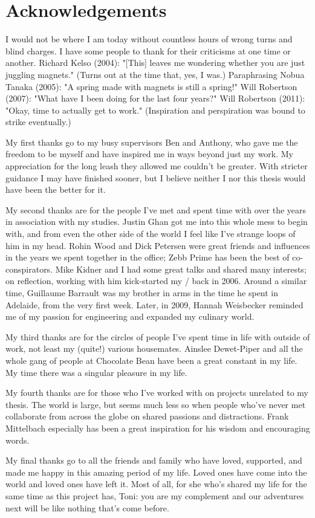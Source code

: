
\section{Acknowledgements}

I would not be where I am today without countless hours of wrong turns and
blind charges.
I have some people to thank for their criticisms at one time or another.
Richard Kelso (2004): "[This] leaves me wondering whether you are just juggling magnets." (Turns out at the time that, yes, I was.)
Paraphrasing Nobua Tanaka (2005): "A spring made with magnets is still a spring!"
Will Robertson (2007): "What have I been doing for the last four years?"
Will Robertson (2011): "Okay, time to actually get to work."
(Inspiration and perspiration was bound to strike eventually.)

My first thanks go to my busy supervisors Ben and Anthony, who gave me the freedom to be myself and have inspired me in ways beyond just my work.
My appreciation for the long leash they allowed me couldn't be greater.
With stricter guidance I may have finished sooner, but I believe neither I nor this thesis would have been the better for it.

My second thanks are for the people I've met and spent time with over the years in association with my studies.
Justin Ghan got me into this whole mess to begin with, and from even the other side of the world I feel like I've strange loops of him in my head.
Rohin Wood and Dick Petersen were great friends and influences in the years we spent together in the office; Zebb Prime has been the best of co-conspirators.
Mike Kidner and I had some great talks and shared many interests; on reflection, working with him kick-started my \PhD/ back in 2006.
Around a similar time, Guillaume Barrault was my brother in arms in the time he spent in Adelaide, from the very first week.
Later, in 2009, Hannah Weisbecker reminded me of my passion for engineering and expanded my culinary world.

My third thanks are for the circles of people I've spent time in life with outside of work, not least my (quite!) various housemates.
Ainslee Dewet-Piper and all the whole gang of people at Chocolate Bean have been a great constant in my life.
My time there was a singular pleasure in my life.

My fourth thanks are for those who I've worked with on projects unrelated to my thesis.
The world is large, but seems much less so when people who've never met collaborate from across the globe on shared passions and distractions.
Frank Mittelbach especially has been a great inspiration for his wisdom and encouraging words.

My final thanks go to all the friends and family who have loved, supported, and made me happy in this amazing period of my life.
Loved ones have come into the world and loved ones have left it.
Most of all, for she who's shared my life for the same time as this project has, Toni: you are my complement and our adventures next will be like nothing that's come before.

